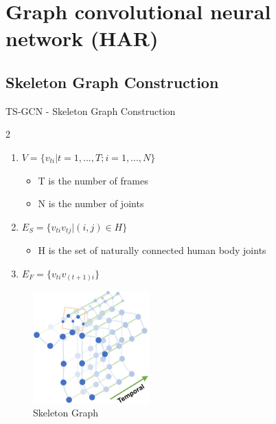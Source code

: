 \section{Graph convolutional neural network (HAR)}

\subsection{Skeleton Graph Construction}
\begin{frame}{TS-GCN - Skeleton Graph Construction}
    \begin{multicols} {2}
        \begin{enumerate}
            \item $V = \{v_{ti} | t = 1,...,T; i = 1,...,N\}$
                  \begin{itemize}
                      \item T is the number of frames
                      \item N is the number of joints
                  \end{itemize}
            \item $E_S = \{v_{ti}v_{tj} | (i, j) \in H\}$
                  \begin{itemize}
                      \item H is the set of naturally connected human body joints
                  \end{itemize}
            \item $E_F = \{v_{ti}v_{(t+1)i}\}$
        \end{enumerate}

        \begin{figure}[htp]
            \centering
            \includegraphics[width=0.4\textwidth]{topics/201031-yan2018spatial/assets/img/skeleton-st-graph.png}
            \caption{Skeleton Graph}
            \label{fig:skeleton-graph}
        \end{figure}
    \end{multicols}
\end{frame}

